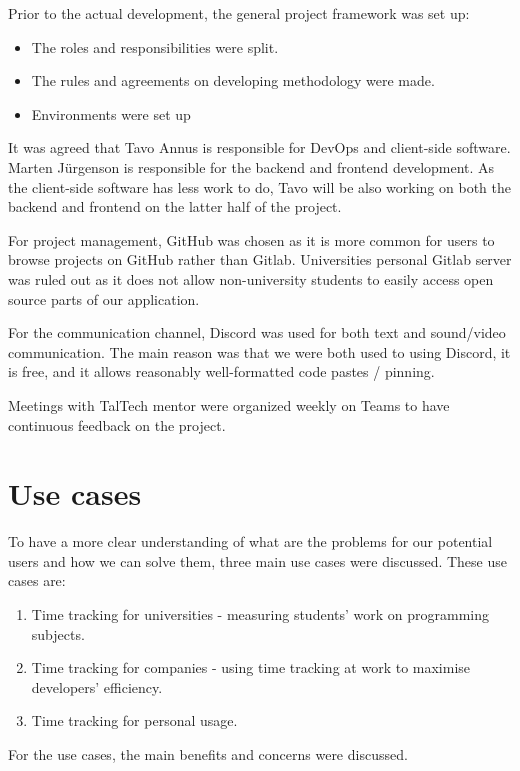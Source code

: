 Prior to the actual development, the general project framework was set up:
\begin{itemize}
    \item The roles and responsibilities were split.
    \item The rules and agreements on developing methodology were made.
    \item Environments were set up
\end{itemize}

It was agreed that Tavo Annus is responsible for DevOps and client-side software.
Marten Jürgenson is responsible for the backend and frontend development.
As the client-side software has less work to do, Tavo will be also working on both the backend and
frontend on the latter half of the project.

For project management, GitHub was chosen as it is more common for users to browse projects on GitHub rather than Gitlab.
Universities personal Gitlab server was ruled out as it does not allow non-university students to easily access open source parts of our application.

For the communication channel, Discord was used for both text and sound/video communication.
The main reason was that we were both used to using Discord, it is free, and it allows reasonably well-formatted code pastes / pinning.

Meetings with TalTech mentor were organized weekly on Teams to have continuous feedback on the project.


\section{Use cases}\label{sec:use-cases}
To have a more clear understanding of what are the problems for our potential users and how we can solve them, three main use cases were discussed.
These use cases are:
\begin{enumerate}
    \item Time tracking for universities - measuring students' work on programming subjects.
    \item Time tracking for companies - using time tracking at work to maximise developers' efficiency.
    \item Time tracking for personal usage.
\end{enumerate}

For the use cases, the main benefits and concerns were discussed.

